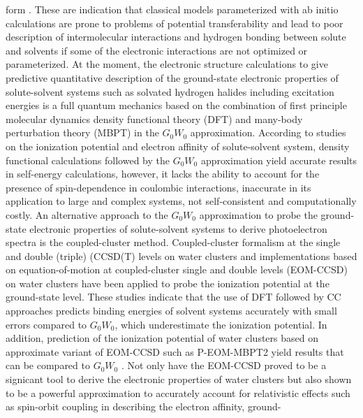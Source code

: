 \documentclass[a4paper,11pt]{report}
\begin{document}
form \citep{wick2017comparison}. These are indication that classical models parameterized with ab initio calculations  
are prone to problems of potential transferability and lead to poor description of intermolecular interactions and hydrogen bonding 
between solute and solvents if some of the electronic interactions are not optimized or parameterized. 
At the moment, the electronic structure calculations to give predictive quantitative description of the ground-state electronic properties of
solute-solvent systems such as solvated  hydrogen halides including excitation energies is a full quantum mechanics 
based on the combination of first principle molecular dynamics density functional theory (DFT) and many-body perturbation theory (MBPT) in the
$G_{0}W_{0}$ approximation. According to studies on the ionization potential and electron affinity of solute-solvent system, density functional 
calculations followed by the $G_{0}W_{0}$ approximation \citep{gaiduk2018electron,pham2017electronic,opalka2014ionization} yield accurate 
results in self-energy calculations, however, it lacks the ability to account for the presence of spin-dependence in coulombic interactions,
inaccurate in its application to large and complex systems, not self-consistent \citep{aryasetiawan1998gw} and computationally costly.
An alternative approach to the $G_{0}W_{0}$ approximation to probe the ground-state electronic properties of solute-solvent systems
to derive photoelectron spectra is the coupled-cluster method. Coupled-cluster formalism at the single and double (triple) (CCSD(T) levels 
\citep{bartlett2007coupled} on water clusters \citep{blase2016erratum} and implementations based on equation-of-motion at coupled-cluster single and double levels
(EOM-CCSD) \citep{musial2011multireference} on water clusters \citep{lange2018relation} have been applied to probe the ionization potential at the ground-state level.
These studies indicate that the use of DFT followed by CC approaches predicts binding energies of solvent systems accurately with small
errors compared to $G_{0}W_{0}$, which underestimate the ionization potential. In addition, prediction of the ionization potential
of water clusters based on approximate variant of EOM-CCSD \citep{dutta2017assessment,dutta2018lower} such as P-EOM-MBPT2 yield results that can be compared
to $G_{0}W_{0}$ \citep{lange2018relation}. Not only have the EOM-CCSD proved to be a signicant tool to derive the electronic properties of water clusters but
also shown to be a powerful approximation to accurately account for relativistic effects such as spin-orbit coupling in describing the electron affinity, ground- 
\end{document}
